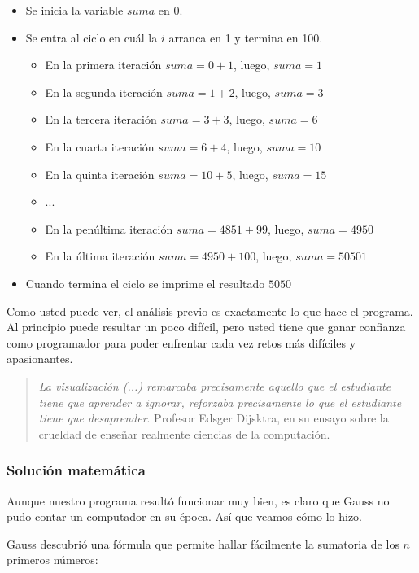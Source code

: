 \begin{itemize}
\item Se inicia la variable $suma$ en 0.
\item Se entra al ciclo en cuál la $i$ arranca en 1 y termina en 100.
	\begin{itemize}
	\item En la primera iteración $suma=0+1$, luego, $suma = 1$
	\item En la segunda iteración $suma=1+2$, luego, $suma = 3$
	\item En la tercera iteración $suma=3+3$, luego, $suma = 6$
	\item En la cuarta iteración $suma=6+4$, luego, $suma = 10$
	\item En la quinta iteración $suma=10+5$, luego, $suma = 15$
	\item ...
	\item En la penúltima iteración $suma=4851+99$, luego, $suma = 4950$
	\item En la última iteración $suma=4950+100$, luego, $suma = 50501$
	\end{itemize}
\item Cuando termina el ciclo se imprime el resultado $5050$
\end{itemize}

Como usted puede ver, el análisis previo es exactamente lo que hace el programa. Al principio puede resultar un poco difícil, pero usted tiene que ganar confianza como programador para poder enfrentar cada vez retos más difíciles y apasionantes.

\begin{quote}
\emph{La visualización (...) remarcaba precisamente aquello que el estudiante tiene que aprender a ignorar, reforzaba precisamente lo que el estudiante tiene que desaprender}.
Profesor Edsger Dijsktra, en su ensayo sobre la crueldad de enseñar realmente ciencias de la computación.
\end{quote}

\subsubsection{Solución matemática}

Aunque nuestro programa resultó funcionar muy bien, es claro que Gauss no pudo contar un computador en su época. Así que veamos cómo lo hizo.

Gauss descubrió una fórmula que permite hallar fácilmente la sumatoria de los $n$ primeros números:


